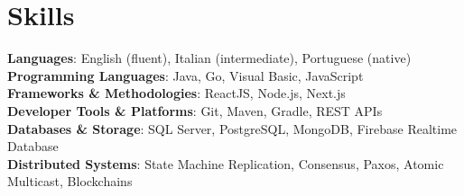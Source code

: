 \documentclass[letterpaper,11pt]{article}
\begin{document}
\section{Skills}
 \begin{itemize}[leftmargin=0.15in, label={}]
    \small{\item{
    \textbf{Languages}{: English (fluent), Italian (intermediate), Portuguese (native)} \\ \vspace{2mm}
     \textbf{Programming Languages}{: Java, Go, Visual Basic, JavaScript} \\ \vspace{2mm}
     \textbf{Frameworks \& Methodologies}{: ReactJS, Node.js, Next.js} \\ \vspace{2mm}
     \textbf{Developer Tools \& Platforms}{: Git, Maven, Gradle, REST APIs} \\ \vspace{2mm}
     \textbf{Databases \& Storage}{: SQL Server, PostgreSQL, MongoDB, Firebase Realtime Database} \\ \vspace{2mm}
     \textbf{Distributed Systems}{: State Machine Replication, Consensus, Paxos, Atomic Multicast, Blockchains} \\ \vspace{2mm}
    }}
 \end{itemize}


\end{document}
